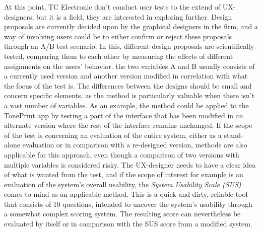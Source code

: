 \noindent
At this point, TC Electronic don't conduct user tests to the extend of UX-designers, but it is a field, they are interested in exploring further. Design proposals are currently decided upon by the graphical designers in the firm, and a way of involving users could be to either confirm or reject these proposals through an A/B test scenario. In this, different design proposals are scientifically tested, comparing them to each other by measuring the effects of different assignments on the users' behavior. the two variables A and B usually consists of a currently used version and another version modified in correlation with what the focus of the test is. The differences between the designs should be small and concern specific elements, as the method is particularly valuable when there isn't a vast number of variables. As an example, the method could be applied to the TonePrint app by testing a part of the interface that has been modified in an alternate version where the rest of the interface remains unchanged. If the scope of the test is concerning an evaluation of the entire system, either as a stand-alone evaluation or in comparison with a re-designed version, methods are also applicable for this approach, even though a comparison of two versions with multiple variables is considered risky. The UX-designer needs to have a clear idea of what is wanted from the test, and if the scope of interest for example is an evaluation of the system's overall usability, the \textit{System Usability Scale (SUS)} comes to mind as an applicable method. This is a quick and dirty, reliable tool that consists of 10 questions, intended to uncover the system's usability through a somewhat complex scoring system. The resulting score can nevertheless be evaluated by itself or in comparison with the SUS score from a modified system.\\

